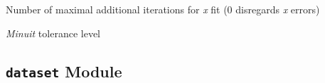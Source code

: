 \documentclass[a4paper,10pt,english]{sphinxmanual}
\begin{document}
\begin{fulllineitems}
\label{index:kafe.constants.M_MAX_X_FIT_ITERATIONS}
Number of maximal additional iterations for \emph{x} fit (0 disregards \emph{x} errors)

\end{fulllineitems}


\begin{fulllineitems}
\label{index:kafe.constants.M_TOLERANCE}
\emph{Minuit} tolerance level

\end{fulllineitems}



\subsection{\texttt{dataset} Module}
\label{index:dataset-module}\label{index:module-kafe.dataset}\label{index:module-dataset}
\end{document}
